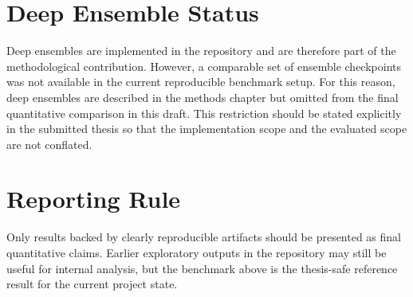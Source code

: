 \section{Deep Ensemble Status}

Deep ensembles are implemented in the repository and are therefore part of the methodological contribution. However, a comparable set of ensemble checkpoints was not available in the current reproducible benchmark setup. For this reason, deep ensembles are described in the methods chapter but omitted from the final quantitative comparison in this draft. This restriction should be stated explicitly in the submitted thesis so that the implementation scope and the evaluated scope are not conflated.

\section{Reporting Rule}

Only results backed by clearly reproducible artifacts should be presented as final quantitative claims. Earlier exploratory outputs in the repository may still be useful for internal analysis, but the benchmark above is the thesis-safe reference result for the current project state.
